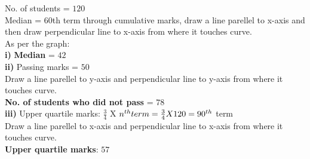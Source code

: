 \documentclass[journal,12pt,twocolumn]{IEEEtran}
\begin{document}
\bigskip

\textbf{} No. of students = $120$\\
Median = $60$th term through cumulative marks, draw a line parellel to x-axis and then draw perpendicular line to x-axis from where it touches curve.\\
As per the graph:\\
\textbf{i) }\textbf{Median }= $42$\\

\textbf{ii)} Passing marks = $50$\\
Draw a line parellel to y-axis and perpendicular line to y-axis from where it touches curve.\\
\textbf{No. of students who did not pass} = $78$\\

\textbf{iii)} Upper quartile marks: $\frac{3}{4}$ X $n^{th} term \\
  = \frac{3}{4} X 120 = 90^{th}$ term\\
Draw a line parellel to x-axis and perpendicular line to x-axis from where it touches curve.\\
\textbf{Upper quartile marks}: $57$
\end{document}
